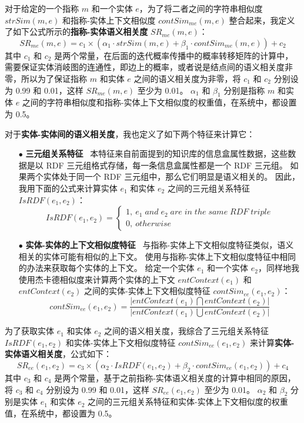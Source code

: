 对于给定的一个指称 $m$ 和一个实体 $e$，为了将二者之间的字符串相似度 $strSim(m,e)$ 和指称-实体上下文相似度 $contSim_{me}(m,e)$ 整合起来，我定义了如下公式所示的\textbf{指称-实体语义相关度} $SR_{me}(m,e)$：
\begin{equation}
SR_{me}(m,e)=c_1\times(\alpha_1 \cdot strSim(m,e) + \beta_1 \cdot contSim_{me}(m,e)) + c_2
\label{equation_srme}
\end{equation}
其中 $c_1$ 和 $c_2$ 是两个常量，在后面的迭代概率传播中的概率转移矩阵的计算中，需要保证实体消岐图的连通性，即边上的概率，或者说是结点间的语义相关度非零，所以为了保证指称 $m$ 和实体 $e$ 之间的语义相关度为非零，将 $c_1$ 和 $c_2$ 分别设为 0.99 和 0.01，这样 $SR_{me}(m,e)$ 至少为 0.01。
$\alpha_1$ 和 $\beta_1$ 分别是指称 $m$ 和实体 $e$ 之间的字符串相似度和指称-实体上下文相似度的权重值，在系统中，都设置为 0.5。
\newline

对于\textbf{实体-实体间的语义相关度}，我也定义了如下两个特征来计算它：
\begin{itemize}
	\item[$\bullet$] \textbf{三元组关系特征} \ 
	本特征来自前面提到的知识库的信息盒属性数据，这些数据是以 RDF 三元组格式存储，每一条信息盒属性都是一个 RDF 三元组。
	如果两个实体处于同一个 RDF 三元组中，那么它们明显是语义相关的。
	因此，我用下面的公式来计算实体 $e_1$ 和实体 $e_2$ 之间的三元组关系特征 $IsRDF(e_1,e_2)$：
	\begin{equation}
  	IsRDF(e_1,e_2)=
  		\left\{ 
      	\begin{array}{l}
      	1,\ e_1\;and\;e_2\;are\;in\;the\;same\;RDF\;triple\\
      	0,\ otherwise
      \end{array} 
  	\right.
  	\end{equation}
    \item[$\bullet$] \textbf{实体-实体的上下文相似度特征} \ 
  	与指称-实体上下文相似度特征类似，语义相关的实体可能有相似的上下文。
  	使用与指称-实体上下文相似度特征中相同的办法来获取每个实体的上下文。
  	给定一个实体 $e_1$ 和一个实体 $e_2$，同样地我使用杰卡德相似度来计算两个实体的上下文 $entContext(e_1)$ 和 $entContext(e_2)$ 之间的实体-实体上下文相似度特征 $contSim_{ee}(e_1, e_2)$：
  	\begin{equation}
		contSim_{ee}(e_1,e_2)=\frac{|entContext(e_1)\bigcap{entContext(e_2)}|}{|entContext(e_1)\bigcup{entContext(e_2)}|}
	\label{contsim}
  	\end{equation}
\end{itemize}
为了获取实体 $e_1$ 和实体 $e_2$ 之间的语义相关度，我综合了三元组关系特征 $IsRDF(e_1,e_2)$ 和实体-实体上下文相似度特征 $contSim_{ee}(e_1, e_2)$ 来计算\textbf{实体-实体语义相关度}，公式如下：
\begin{equation}
SR_{ee}(e_1,e_2)=c_3\times(\alpha_2 \cdot IsRDF(e_1,e_2) + \beta_2 \cdot contSim_{ee}(e_1,e_2)) + c_4
\label{equation_sree}
\end{equation}
其中 $c_3$ 和 $c_4$ 是两个常量，基于之前指称-实体语义相关度的计算中相同的原因，将 $c_3$ 和 $c_4$ 分别设为 0.99 和 0.01，这样 $SR_{ee}(e_1,e_2)$ 至少为 0.01。
$\alpha_2$ 和 $\beta_2$ 分别是实体 $e_1$ 和实体 $e_2$ 之间的三元组关系特征和实体-实体上下文相似度的权重值，在系统中，都设置为 0.5。
\newline


